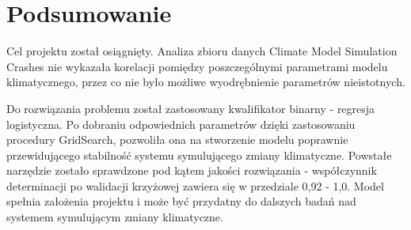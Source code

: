 \documentclass[11pt, a4paper, notitlepage]{report}
\begin{document}
\chapter{Podsumowanie}
Cel projektu został osiągnięty. Analiza zbioru danych Climate Model Simulation Crashes nie wykazała korelacji pomiędzy poszczególnymi parametrami modelu klimatycznego, przez co nie było możliwe wyodrębnienie parametrów nieistotnych.\par 
Do rozwiązania problemu został zastosowany kwalifikator binarny - regresja logistyczna. Po dobraniu odpowiednich parametrów dzięki zastosowaniu procedury GridSearch, pozwoliła ona na stworzenie modelu poprawnie przewidującego stabilność systemu symulującego zmiany klimatyczne. Powstałe narzędzie zostało sprawdzone pod kątem jakości rozwiązania - współczynnik determinacji po walidacji krzyżowej zawiera się w przedziale 0,92 - 1,0. Model spełnia założenia projektu i może być przydatny do dalszych badań nad systemem symulującym zmiany klimatyczne.
\end{document}
